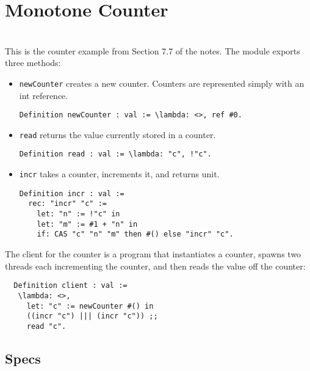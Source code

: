 \section{Monotone Counter}
\label{section:monotone-counter}

\\

This is the counter example from Section 7.7 of the notes. The module exports three methods:

\begin{itemize}

\item \texttt{newCounter} creates a new counter. Counters are represented simply with an int reference.

\begin{verbatim}
Definition newCounter : val := \lambda: <>, ref #0.
\end{verbatim}

\item \texttt{read} returns the value currently stored in a counter.

\begin{verbatim}
Definition read : val := \lambda: "c", !"c".
\end{verbatim}

\item \texttt{incr} takes a counter, increments it, and returns unit.

\begin{verbatim}
Definition incr : val :=
  rec: "incr" "c" :=
    let: "n" := !"c" in
    let: "m" := #1 + "n" in
    if: CAS "c" "n" "m" then #() else "incr" "c".
\end{verbatim}

\end{itemize}

The client for the counter is a program that instantiates a counter, spawns two threads each incrementing the counter, and then reads the value off the counter:

\begin{verbatim}
  Definition client : val :=
   \lambda: <>,
     let: "c" := newCounter #() in
     ((incr "c") ||| (incr "c")) ;;
     read "c".   
\end{verbatim}

\subsection{Specs}

